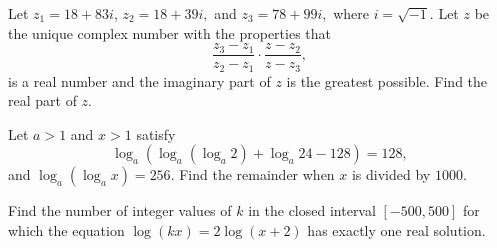 \begin{question}[name={2017 AIME I, \href{https://artofproblemsolving.com/community/c4p7812824}{Problem 10}}]
	Let $z_1 = 18 + 83i$, $z_2 = 18 + 39i, $ and $z_3 = 78 + 99i,$ where $i = \sqrt{-1}$. Let $z$ be the unique complex number with the properties that $$\frac{z_3 - z_1}{z_2 - z_1} \cdot \frac{z - z_2}{z - z_3},$$ is a real number and the imaginary part of $z$ is the greatest possible. Find the real part of $z$.	
	
\end{question}


%	












\begin{question}[name={2017 AIME I, \href{https://artofproblemsolving.com/community/c4p7812869}{Problem 14}}]
	Let $a > 1$ and $x > 1$ satisfy $$\log_a(\log_a(\log_a 2) + \log_a 24 - 128) = 128,$$ and $\log_a(\log_a x) = 256$. Find the remainder when $x$ is divided by $1000$.	
\end{question}


%	

















\begin{question}[name={2017 AIME II, \href{https://artofproblemsolving.com/community/c4p7910326}{Problem 7}}]
	Find the number of integer values of $k$ in the closed interval $[-500,500]$ for which the equation $\log(kx)=2\log(x+2)$ has exactly one real solution.	
\end{question}


%	










